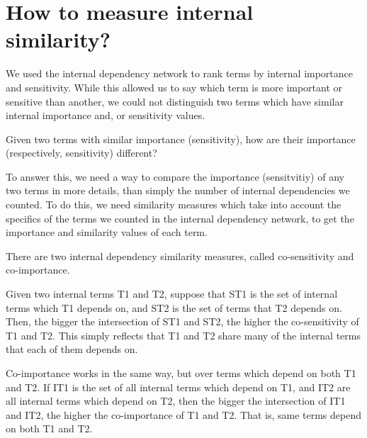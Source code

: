 \section{How to measure internal similarity?}
\label{c7:s4}
We used the internal dependency network to rank terms by internal importance and sensitivity. While this allowed us to say which term is more important or sensitive than another, we could not distinguish two terms which have similar internal importance and, or sensitivity values.

Given two terms with similar importance (sensitivity), how are their importance (respectively, sensitivity) different?

To answer this, we need a way to compare the importance (sensitvitiy) of any two terms in more details, than simply the number of internal dependencies we counted. To do this, we need similarity measures which take into account the specifics of the terms we counted in the internal dependency network, to get the importance and similarity values of each term.

There are two internal dependency similarity measures, called co-sensitivity and co-importance.

Given two internal terms T1 and T2, suppose that ST1 is the set of internal terms which T1 depends on, and ST2 is the set of terms that T2 depends on. Then, the bigger the intersection of ST1 and ST2, the higher the co-sensitivity of T1 and T2. This simply reflects that T1 and T2 share many of the internal terms that each of them depends on.

Co-importance works in the same way, but over terms which depend on both T1 and T2. If IT1 is the set of all internal terms which depend on T1, and IT2 are all internal terms which depend on T2, then the bigger the intersection of IT1 and IT2, the higher the co-importance of T1 and T2. That is, same terms depend on both T1 and T2.

